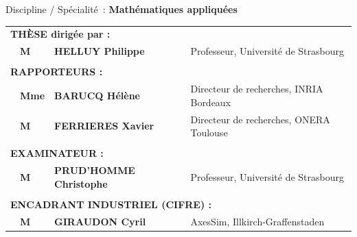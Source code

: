\documentclass[a4paper,12pt]{report}
\begin{document}
\begin{titlepage}
	\large Discipline / Spécialité :
	\Large\textbf{Mathématiques appliquées}
	\vfill
	\vfill
	\normalsize
	\begin{tabular}{llll}
		\multicolumn{4}{l}{\textbf{\MakeUppercase{Thèse} dirigée par :}} \\
		& \textbf{M} & \textbf{HELLUY Philippe} &
		Professeur, Université de Strasbourg \\
		& & & \\
		\multicolumn{4}{l}{\textbf{\MakeUppercase{Rapporteurs} :}} \\
		& \textbf{Mme} & \textbf{BARUCQ Hélène} &
		Directeur de recherches, INRIA Bordeaux \\
		& \textbf{M} & \textbf{FERRIERES Xavier} &
		Directeur de recherches, ONERA Toulouse \\
		& & & \\
		\multicolumn{4}{l}{\textbf{\MakeUppercase{Examinateur} :}} \\
		& \textbf{M} & \textbf{PRUD'HOMME Christophe} &
		Professeur, Université de Strasbourg \\
		& & & \\
		\multicolumn{4}{l}{\textbf{\MakeUppercase{Encadrant industriel (CIFRE)} :}} \\
		& \textbf{M} & \textbf{GIRAUDON Cyril} &
		AxesSim, Illkirch-Graffenstaden \\
	\end{tabular}
\end{titlepage}
\end{document}
